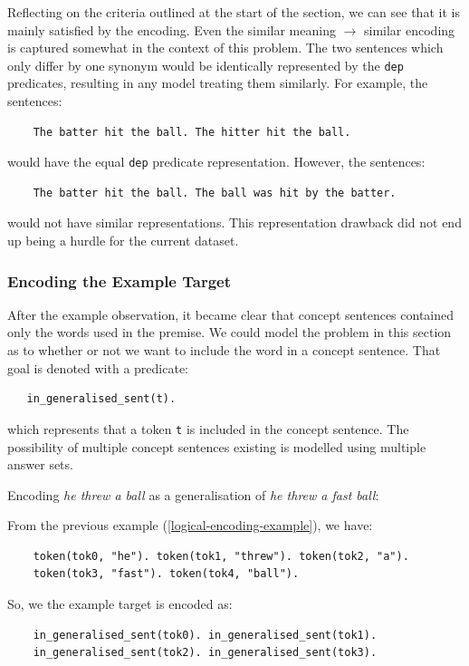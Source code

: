 Reflecting on the criteria outlined at the start of the section, we can see that it is mainly satisfied by the encoding. 
Even the similar meaning $\rightarrow$ similar encoding is captured somewhat in the context of this problem.
The two sentences which only differ by one synonym would be identically represented by the \verb_dep_ predicates, resulting in any model treating them similarly.
For example, the sentences:
\begin{verbatim}
    The batter hit the ball. The hitter hit the ball.
\end{verbatim}
would have the equal \verb_dep_ predicate representation. 
However, the sentences:
\begin{verbatim}
    The batter hit the ball. The ball was hit by the batter.
\end{verbatim}
would not have similar representations.
This representation drawback did not end up being a hurdle for the current dataset.

\subsubsection{Encoding the Example Target}
\label{encoding-the-example-target}


After the example observation, it became clear that concept sentences contained only the words used in the premise.
We could model the problem in this section as to whether or not we want to include the word in a concept sentence.
That goal is denoted with a predicate:
\begin{verbatim}
   in_generalised_sent(t).
\end{verbatim}
which represents that a token \verb+t+ is included in the concept sentence.
The possibility of multiple concept sentences existing is modelled using multiple answer sets.
\begin{example}
\label{example-encoding-target}
Encoding \textit{he threw a ball} as a generalisation of \textit{he threw a fast ball}:

From the previous example (\ref{logical-encoding-example}), we have:
\begin{verbatim}
    token(tok0, "he"). token(tok1, "threw"). token(tok2, "a"). 
    token(tok3, "fast"). token(tok4, "ball").
\end{verbatim}
So, we the example target is encoded as:
\begin{verbatim}
    in_generalised_sent(tok0). in_generalised_sent(tok1). 
    in_generalised_sent(tok2). in_generalised_sent(tok3). 
\end{verbatim}

\end{example}

